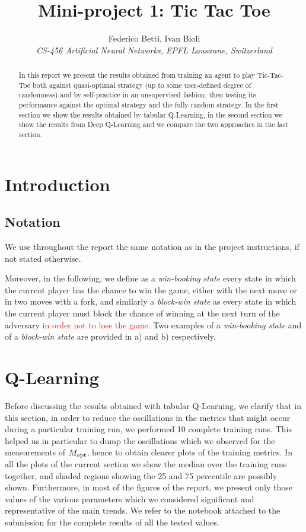 \documentclass[10pt]{IEEEtran}
\begin{document}
\title{Mini-project 1: Tic Tac Toe}

\author{
   Federico Betti, Ivan Bioli\\
  \textit{CS-456 Artificial Neural Networks, EPFL Lausanne, Switzerland}
}


\maketitle

\begin{abstract}
In this report we present the results obtained from training an agent to play Tic-Tac-Toe both against quasi-optimal strategy (up to some user-defined degree of randomness) and by self-practice in an unsupervised fashion, then testing its performance against the optimal strategy and the fully random strategy. In the first section we show the results obtained by tabular Q-Learning, in the second section we show the results from Deep Q-Learning and we compare the two approaches in the last section.
\end{abstract}

\section{Introduction}
\subsection{Notation}
We use throughout the report the same notation as in the project instructions, if not stated otherwise.

Moreover, in the following, we define as a \emph{win-booking state} every state in which the current player has the chance to win the game, either with the next move or in two moves with a fork, and similarly a \emph{block-win state} as every state in which the current player must block the chance of winning at the next turn of the adversary \textcolor{red}{in order not to lose the game}. Two examples of a \emph{win-booking state} and of a \emph{block-win state} are provided in  a) and b) respectively.

\section{Q-Learning}
Before discussing the results obtained with tabular Q-Learning, we clarify that in this section, in order to reduce the oscillations in the metrics that might occur during a particular training run, we performed 10 complete training runs. This helped us in particular to dump the oscillations which we observed for the measurements of $M_{\text{opt}}$, hence to obtain clearer plots of the training metrics. In all the plots of the current section we show the median over the training runs together, and shaded regions showing the 25 and 75 percentile are possibly shown. Furthermore, in most of the figures of the report, we present only those values of the various parameters which we considered significant and representative of the main trends. We refer to the notebook attached to the submission for the complete results of all the tested values.
\end{document}
